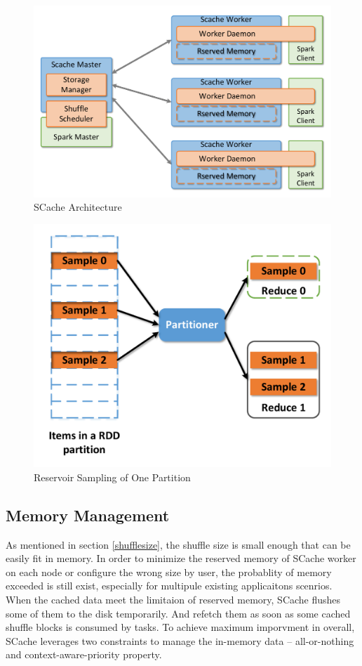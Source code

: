 \begin{figure}
	\centering
	\includegraphics[width=\linewidth]{fig/arch}
	\caption{SCache Architecture}
	\label{fig:arch}
\end{figure}
\begin{figure}
	\centering
	\includegraphics[width=\linewidth]{fig/sample}
	\caption{Reservoir Sampling of One Partition}
	\label{fig:sample}
\end{figure}

\subsection{Memory Management}
As mentioned in section \ref{shufflesize}, the shuffle size is small enough that can be easily fit in memory. In order to minimize the reserved memory of SCache worker on each node or configure the wrong size by user, the probablity of memory exceeded is still exist, especially for multipule existing applicaitons scenrios. When the cached data meet the limitaion of reserved memory, SCache flushes some of them to the disk temporarily. And refetch them as soon as some cached shuffle blocks is consumed by tasks. To achieve maximum imporvment in overall, SCache leverages two constraints to manage the in-memory data -- all-or-nothing and  context-aware-priority property.
